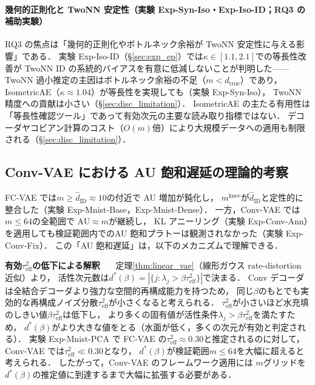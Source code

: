 \documentclass[11pt,a4paper]{jsarticle}
\newcommand{\kap}{\kappa}
\newcommand{\mknee}{m^{\mathrm{knee}}}
\begin{document}
\paragraph{幾何的正則化と TwoNN 安定性（実験 Exp-Syn-Iso・Exp-Iso-ID；RQ3 の補助実験）}
RQ3 の焦点は「幾何的正則化やボトルネック余裕が TwoNN 安定性に与える影響」である．
実験 Exp-Iso-ID（§\ref{sec:exp_ep}）では$\kap \in [1.1, 2.1]$での等長性改善が
TwoNN ID の系統的バイアスを有意に低減しないことが判明した——
TwoNN 過小推定の主因はボトルネック余裕の不足（$m < d_\mathrm{true}$）であり，
IsometricAE（$\kap \approx 1.04$）が等長性を実現しても（実験 Exp-Syn-Iso），
TwoNN 精度への貢献は小さい（§\ref{sec:disc_limitation}）．
IsometricAE の主たる有用性は「等長性確認ツール」であって有効次元の主要な読み取り指標ではない．
デコーダヤコビアン計算のコスト（$O(m)$倍）により大規模データへの適用も制限される（§\ref{sec:disc_limitation}）．

\subsection{Conv-VAE における AU 飽和遅延の理論的考察}\label{sec:disc_convvae}

FC-VAE では$m \geq \hat{d}_\mathrm{ID} \approx 10$の付近で AU 増加が鈍化し，
$\mknee$が$\hat{d}_\mathrm{ID}$と定性的に整合した（実験 Exp-Mnist-Base，Exp-Mnist-Dense）．
一方，Conv-VAE では$m \leq 64$の全範囲で AU$\approx m$が継続し，
KL アニーリング（実験 Exp-Conv-Ann）を適用しても検証範囲内でのAU 飽和プラトーは観測されなかった（実験 Exp-Conv-Fix）．
この「AU 飽和遅延」は，以下のメカニズムで理解できる．

\textbf{有効$\tau^2_\mathrm{eff}$の低下による解釈}~~~
定理\ref{thm:linear_vae}（線形ガウス rate-distortion 近似）より，
活性次元数は$d^*(\beta) = |\{j : \lambda_j > \beta\tau^2_\mathrm{eff}\}|$で決まる．
Conv デコーダは全結合デコーダより強力な空間的再構成能力を持つため，
同じ$\beta$のもとでも実効的な再構成ノイズ分散$\tau^2_\mathrm{eff}$が小さくなると考えられる．
$\tau^2_\mathrm{eff}$が小さいほど水充填のしきい値$\beta\tau^2_\mathrm{eff}$は低下し，
より多くの固有値が活性条件$\lambda_j > \beta\tau^2_\mathrm{eff}$を満たすため，
$d^*(\beta)$がより大きな値をとる（水面が低く，多くの次元が有効と判定される）．
実験 Exp-Mnist-PCA で FC-VAE の$\tau^2_\mathrm{eff} \approx 0.30$と推定されるのに対して，
Conv-VAE では$\tau^2_\mathrm{eff} \ll 0.30$となり，
$d^*(\beta)$が検証範囲$m \leq 64$を大幅に超えると考えられる．
したがって，Conv-VAE のフレームワーク適用には
$m$グリッドを$d^*(\beta)$の推定値に到達するまで大幅に拡張する必要がある．
\end{document}
